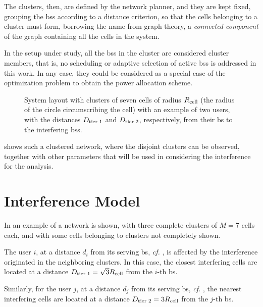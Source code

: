 The clusters, then, are defined by the network planner, and they are kept fixed,
grouping the \glspl{bs} according to a distance criterion, so that the cells
belonging to a cluster must form, borrowing the name from graph theory, a
\emph{connected component} of the graph containing all the cells in the system.

In the setup under study, all the \glspl{bs} in the cluster are considered
cluster members, that is, no scheduling or adaptive selection of active
\glspl{bs} is addressed in this work. In any case, they could be considered as a
special case of the optimization problem to obtain the power allocation scheme.

\begin{figure}[t]
\begin{center}
    \hspace*{1mm}
\end{center}
\caption{System layout with clusters of seven cells of radius $R_{\text{cell}}$ (the
radius of the circle circumscribing the cell) with an example of two users,
with the distances $D_{\text{tier 1}}$ and $D_{\text{tier 2}}$, respectively, from their \gls{bs} to
the interfering \glspl{bs}.}
\label{fig:achiev_cluster_layout}
\end{figure}

 shows such a clustered network, where the
disjoint clusters can be observed, together with other parameters that will be
used in considering the interference for the analysis.

\section{Interference Model}\label{sec:achiev_interf}

In  an example of a network is shown, with three
complete clusters of $M=7$ cells each, and with some cells belonging to clusters
not completely shown.

The user $i$, at a distance $d_i$ from its serving \gls{bs}, \emph{cf.}
, is affected by the interference originated in the
neighboring clusters. In this case, the closest interfering cells are located at
a distance $D_{\text{tier 1}} = \sqrt{3} R_{\text{cell}}$ from the $i$-th \gls{bs}.

Similarly, for the user $j$, at a distance $d_j$ from its serving \gls{bs},
\emph{cf.} , the nearest interfering cells are located at
a distance $D_{\text{tier 2}} = 3R_{\text{cell}}$ from the $j$-th \gls{bs}.

